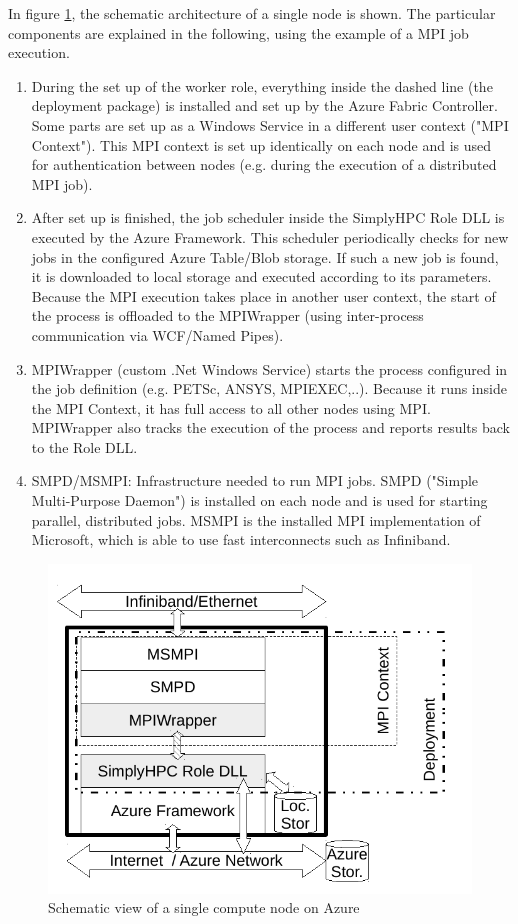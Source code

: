 \documentclass[3p,times]{elsarticle}
\begin{document}
In figure \ref{fig:schemaRole}, the schematic architecture of a single node is shown. The particular components are explained in the following, using the example of a MPI job execution.

\begin{enumerate}
	\item During the set up of the worker role, everything inside the dashed line (the deployment package) is installed and set up by the Azure Fabric Controller. Some parts are set up as a Windows Service in a different user context ("MPI Context"). This MPI context is set up identically on each node and is used for authentication between nodes (e.g. during the execution of a distributed MPI job).

	\item After set up is finished, the job scheduler inside the SimplyHPC Role DLL is executed by the Azure Framework. This scheduler periodically checks for new jobs in the configured Azure Table/Blob storage. If such a new job is found, it is downloaded to local storage and executed according to its parameters. Because the MPI execution takes place in another user context, the start of the process is offloaded to the MPIWrapper (using inter-process communication via WCF/Named Pipes).

	\item MPIWrapper (custom .Net Windows Service) starts the process configured in the job definition (e.g. PETSc, ANSYS, MPIEXEC,..). Because it runs inside the MPI Context, it has full access to all other nodes using MPI. MPIWrapper also tracks the execution of the process and reports results back to the Role DLL.

	\item SMPD/MSMPI: Infrastructure needed to run MPI jobs. SMPD ("Simple Multi-Purpose Daemon") is installed on each node and is used for starting parallel, distributed jobs. MSMPI is the installed MPI implementation of Microsoft, which is able to use fast interconnects such as Infiniband.
\end{enumerate}
\begin{figure}[h]
	\centering
	\includegraphics[width=.5\linewidth]{azureWorkerRole.pdf}
	\caption{Schematic view of a single compute node on Azure}

	\label{fig:schemaRole}
\end{figure}
\end{document}
